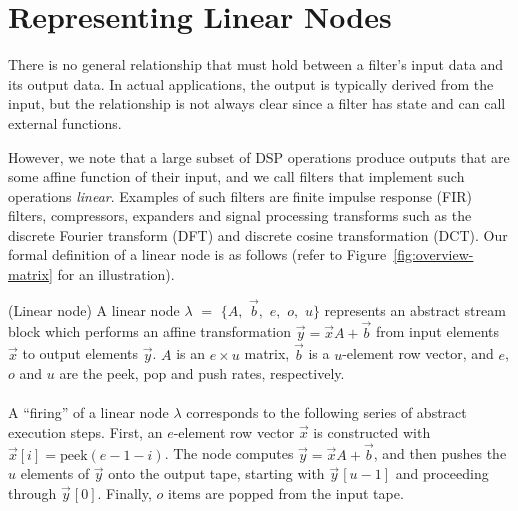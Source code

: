 \section{Representing Linear Nodes}
\label{sec:linearrep}

There is no general relationship that must hold between a
filter's input data and its output data. In actual applications, the
output is typically derived from the input, but the relationship is
not always clear since a filter has state and can call external
functions.

However, we note that a large subset of DSP operations produce outputs
that are some affine function of their input, and we call
filters that implement such operations {\it linear}. Examples of such
filters are finite impulse response (FIR) filters, compressors,
expanders and signal processing transforms such as the discrete
Fourier transform (DFT) and discrete cosine transformation (DCT).  Our
formal definition of a linear node is as follows (refer to
Figure~\ref{fig:overview-matrix} for an illustration). 
\vspace{-4pt}
\begin{definition}(Linear node)
A linear node $\lambda$ $=$ $\{A,$ $\vec{b},$ $e,$ $o,$ $u\}$
represents an abstract stream block which performs an affine
transformation $\vec{y} = \vec{x} A + \vec{b}$ from input elements 
$\vec{x}$ to output elements $\vec{y}$. $A$ is an $e \times u$ matrix, $\vec{b}$ is a
$u$-element row vector, and $e$, $o$ and $u$ are the peek, pop and
push rates, respectively. \\ 
~ \vspace{-6pt} \\
A ``firing'' of a linear node $\lambda$ corresponds to the following
series of abstract execution steps.  First, an $e$-element row vector
$\vec{x}$ is constructed with $\vec{x}[i] = \mbox{peek}(e-1-i)$.  The node
computes $\vec{y} = \vec{x} A + \vec{b}$, and then pushes the $u$ elements 
of $\vec{y}$ onto the output tape, starting with $\vec{y}\hspace{1pt}[u-1]$ 
and proceeding through $\vec{y}\hspace{1pt}[0]$.
Finally, $o$ items are popped from the input tape.
\end{definition} \vspace{-2pt}


